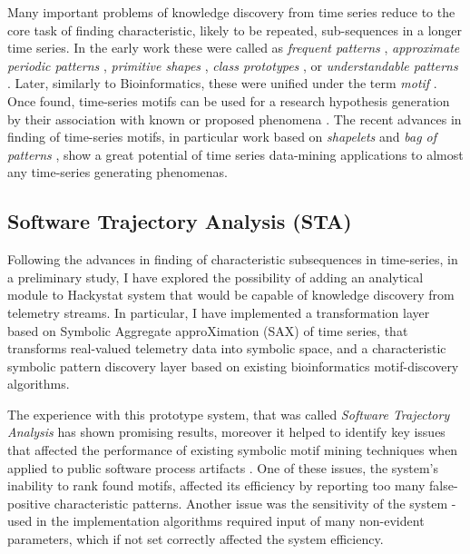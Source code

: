Many important problems of knowledge discovery from time series reduce to the core task of finding 
characteristic, likely to be repeated, sub-sequences in a longer time series. 
In the early work these were called as 
\textit{frequent patterns} \cite{citeulike:5159615}, 
\textit{approximate periodic patterns} \cite{citeulike:1959582},
\textit{primitive shapes} \cite{citeulike:5898869}, 
\textit{class prototypes} \cite{citeulike:4406444}, 
or \textit{understandable patterns} \cite{citeulike:3978076}. 
Later, similarly to Bioinformatics, these were unified under the term \textit{motif} \cite{citeulike:3977965}.
Once found, time-series motifs can be used for a research hypothesis generation by their association 
with known or proposed phenomena \cite{citeulike:3977965}. 
The recent advances in finding of time-series motifs, in particular work based on \textit{shapelets} 
\cite{citeulike:7344347} \cite{citeulike:11957982} \cite{citeulike:12552293} and \textit{bag of patterns} 
\cite{citeulike:10525778}, show a great potential of time series data-mining applications to almost any 
time-series generating phenomenas.

\subsection{Software Trajectory Analysis (STA)}
Following the advances in finding of characteristic subsequences in time-series, in a preliminary study,
I have explored the possibility of adding an analytical module to Hackystat system that would be capable 
of knowledge discovery from telemetry streams. 
In particular, I have implemented a transformation layer based on Symbolic Aggregate approXimation (SAX) 
of time series, that transforms real-valued telemetry data into symbolic space, and a characteristic symbolic 
pattern discovery layer based on existing bioinformatics motif-discovery algorithms. 

The experience with this prototype system, that was called \textit{Software Trajectory Analysis} has shown 
promising results, moreover it helped to identify key issues that affected the performance of existing 
symbolic motif mining techniques when applied to public software process artifacts \cite{csdl2-10-09}. 
One of these  issues, the system's inability to rank found motifs, affected its efficiency by reporting too 
many false-positive characteristic patterns. Another issue was the sensitivity of the system - used in 
the implementation algorithms required input of many non-evident parameters, which if not set correctly
affected the system efficiency.

